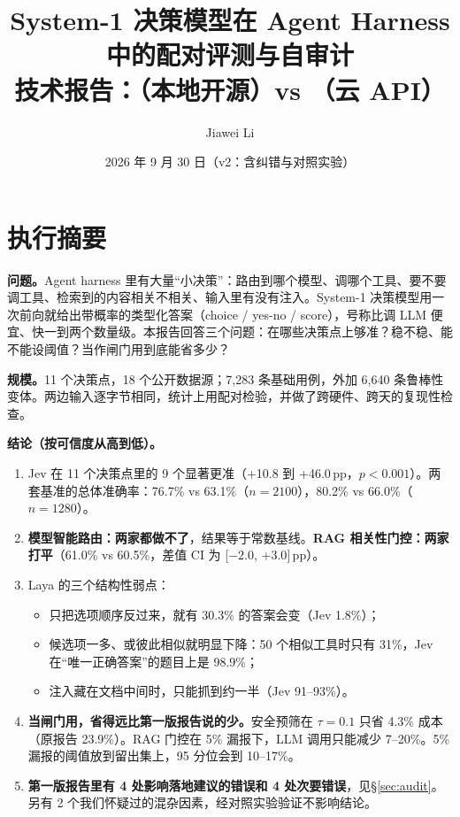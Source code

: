 \documentclass[UTF8,fontset=none,zihao=-4]{ctexart}
\title{\textbf{System-1 决策模型在 Agent Harness 中的配对评测与自审计}\\[4pt]\large 技术报告：\laya{}（本地开源）vs \jev{}（云 API）}
\author{Jiawei Li}
\date{2026 年 9 月 30 日\quad（v2：含纠错与对照实验）}
\newcommand{\laya}{\textsf{Laya}}
\newcommand{\jev}{\textsf{Jev}}
\newcommand{\pp}{\,pp}
\begin{document}
\maketitle
\tableofcontents
\newpage

\section*{执行摘要}
\textbf{问题。}Agent harness 里有大量“小决策”：路由到哪个模型、调哪个工具、要不要调工具、检索到的内容相关不相关、输入里有没有注入。System-1 决策模型用一次前向就给出带概率的类型化答案（choice / yes-no / score），号称比调 LLM 便宜、快一到两个数量级。本报告回答三个问题：在哪些决策点上够准？稳不稳、能不能设阈值？当作闸门用到底能省多少？

\textbf{规模。}11 个决策点，18 个公开数据源；7{,}283 条基础用例，外加 6{,}640 条鲁棒性变体。两边输入逐字节相同，统计上用配对检验，并做了跨硬件、跨天的复现性检查。

\textbf{结论（按可信度从高到低）。}
\begin{enumerate}
\item \jev{} 在 11 个决策点里的 9 个显著更准（+10.8 到 +46.0\pp{}，$p<0.001$）。两套基准的总体准确率：76.7\% vs 63.1\%（$n{=}2100$），80.2\% vs 66.0\%（$n{=}1280$）。
\item \textbf{模型智能路由：两家都做不了}，结果等于常数基线。\textbf{RAG 相关性门控：两家打平}（61.0\% vs 60.5\%，差值 CI 为 [$-2.0$, $+3.0$]\pp）。
\item \laya{} 的三个结构性弱点：
  \begin{itemize}
  \item 只把选项顺序反过来，就有 30.3\% 的答案会变（\jev{} 1.8\%）；
  \item 候选项一多、或彼此相似就明显下降：50 个相似工具时只有 31\%，\jev{} 在“唯一正确答案”的题目上是 98.9\%；
  \item 注入藏在文档中间时，只能抓到约一半（\jev{} 91--93\%）。
  \end{itemize}
\item \textbf{当闸门用，省得远比第一版报告说的少。}安全预筛在 $\tau{=}0.1$ 只省 4.3\% 成本（原报告 23.9\%）。RAG 门控在 5\% 漏报下，LLM 调用只能减少 7--20\%。5\% 漏报的阈值放到留出集上，95 分位会到 10--17\%。
\item \textbf{第一版报告里有 4 处影响落地建议的错误和 4 处次要错误}，见\S\ref{sec:audit}。另有 2 个我们怀疑过的混杂因素，经对照实验验证不影响结论。
\end{enumerate}
\end{document}
